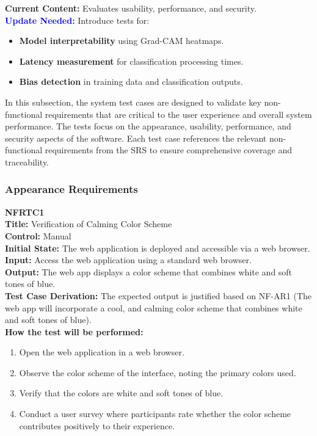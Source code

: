 \documentclass[12pt, titlepage]{article}
\begin{document}
\textbf{Current Content:} Evaluates usability, performance, and security. \\
\textbf{\textcolor{blue}{Update Needed:}} Introduce tests for:
\begin{itemize}
    \item \textbf{Model interpretability} using Grad-CAM heatmaps.
    \item \textbf{Latency measurement} for classification processing times.
    \item \textbf{Bias detection} in training data and classification outputs.
\end{itemize}

In this subsection, the system test cases are designed to validate key non-functional requirements
that are critical to the user experience and overall system performance. The tests focus on the
appearance, usability, performance, and security aspects of the software. Each test case
references the relevant non-functional requirements from the SRS to ensure comprehensive coverage
and traceability.

\subsubsection{Appearance Requirements}
\textbf{NFRTC1}\\
\textbf{Title:} Verification of Calming Color Scheme\\
\textbf{Control:} Manual\\
\textbf{Initial State:} The web application is deployed and accessible via a web browser.\\
\textbf{Input:} Access the web application using a standard web browser.\\
\textbf{Output:} The web app displays a color scheme that combines white and soft tones of blue.\\
\textbf{Test Case Derivation:} The expected output is justified based on NF-AR1 (The web app will incorporate a cool, and calming color scheme that combines white and soft tones of blue).\\
\textbf{How the test will be performed:}
\begin{enumerate}
  \item Open the web application in a web browser.
  \item Observe the color scheme of the interface, noting the primary colors used.
  \item Verify that the colors are white and soft tones of blue.
  \item Conduct a user survey where participants rate whether the color scheme contributes positively to their experience.
\end{enumerate}
\vspace{1em}
\end{document}
